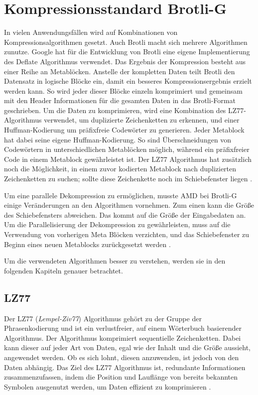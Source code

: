 \section{Kompressionsstandard Brotli-G}
\label{sec:brotlig}
In vielen Anwendungsfällen wird auf Kombinationen von Kompressionsalgorithmen gesetzt.
Auch Brotli macht sich mehrere Algorithmen zunutze.
Google hat für die Entwicklung von Brotli eine eigene Implementierung des Deflate Algorithmus verwendet.
Das Ergebnis der Kompression besteht aus einer Reihe an Metablöcken.
Anstelle der kompletten Daten teilt Brotli den Datensatz in logische Blöcke ein, damit ein besseres Kompressionsergebnis erzielt werden kann.
So wird jeder dieser Blöcke einzeln komprimiert und gemeinsam mit den Header Informationen für die gesamten Daten in das Brotli-Format geschrieben.
Um die Daten zu komprimieren, wird eine Kombination des LZ77-Algorithmus verwendet, um duplizierte Zeichenketten zu erkennen, und einer Huffman-Kodierung um präfixfreie Codewörter zu generieren.
Jeder Metablock hat dabei seine eigene Huffman-Kodierung.
So sind Überschneidungen von Codewörtern in unterschiedlichen Metablöcken möglich, während ein präfixfreier Code in einem Metablock gewährleistet ist.
Der LZ77 Algorithmus hat zusätzlich noch die Möglichkeit, in einem zuvor kodierten Metablock nach duplizierten Zeichenketten zu suchen; sollte diese Zeichenkette noch im Schiebefenster liegen \cite{rfc7932}. \newline

Um eine parallele Dekompression zu ermöglichen, musste AMD bei Brotli-G einige Veränderungen an den Algorithmen vornehmen.
Zum einen kann die Größe des Schiebefensters abweichen.
Das kommt auf die Größe der Eingabedaten an.
Um die Parallelisierung der Dekompression zu gewährleisten, muss auf die Verwendung von vorherigen Meta Blöcken verzichten, und das Schiebefenster zu Beginn eines neuen Metablocks zurückgesetzt werden \cite{AMD2024}. \newline

Um die verwendeten Algorithmen besser zu verstehen, werden sie in den folgenden Kapiteln genauer betrachtet.

\subsection{LZ77}
\label{subsubsec:lz77}
Der LZ77 (\textit{Lempel-Ziv77}) Algorithmus gehört zu der Gruppe der Phrasenkodierung und ist ein verlustfreier, auf einem Wörterbuch basierender Algorithmus.
Der Algorithmus komprimiert sequentielle Zeichenketten.
Dabei kann dieser auf jeder Art von Daten, egal wie der Inhalt und die Größe aussieht, angewendet werden.
Ob es sich lohnt, diesen anzuwenden, ist jedoch von den Daten abhängig.
Das Ziel des LZ77 Algorithmus ist, redundante Informationen zusammenzufassen, indem die Position und Lauflänge von bereits bekannten Symbolen ausgenutzt werden, um Daten effizient zu komprimieren \cite{Strutz2009}. \newline

